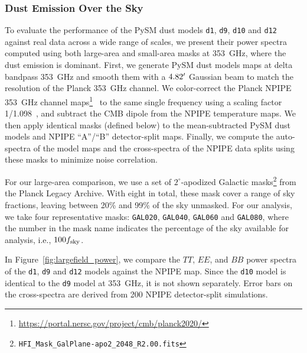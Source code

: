 \documentclass[twocolumn]{aastex631}
\begin{document}
\subsubsection{Dust Emission Over the Sky} 
\label{sec:dust_validation}
To evaluate the performance of the PySM dust models \texttt{d1}, \texttt{d9}, \texttt{d10} and \texttt{d12} against real data across a wide range of scales, we present their power spectra computed using both large-area and small-area masks at 353~GHz, where the dust emission is dominant. First, we generate PySM dust models maps at delta bandpass 353~GHz and smooth them with a $4.82\mbox{$^\prime$}$ Gaussian beam to match the resolution of the Planck 353~GHz channel. We color-correct the Planck NPIPE 353~GHz channel maps\footnote{\url{https://portal.nersc.gov/project/cmb/planck2020/}}~\citep{PlanckCollaboration:2020} to the same single frequency using a scaling factor 1/1.098~\citep{planck2016-l11A}, and subtract the CMB dipole from the NPIPE temperature maps. We then apply identical masks (defined below) to the mean-subtracted PySM dust models and NPIPE ``A''/``B'' detector-split maps. Finally, we compute the auto-spectra of the model maps and the cross-spectra of the NPIPE data splits using these masks to minimize noise correlation. 

For our large-area comparison, we use a set of $2^\circ$-apodized Galactic masks\footnote{\texttt{HFI\_Mask\_GalPlane-apo2\_2048\_R2.00.fits}} from the Planck Legacy Archive. With eight in total, these mask cover a range of sky fractions, leaving between 20\% and 99\% of the sky unmasked. For our analysis, we take four representative masks: \texttt{GAL020}, \texttt{GAL040}, \texttt{GAL060} and \texttt{GAL080}, where the number in the mask name indicates the percentage of the sky available for analysis, i.e., $100 f_{\rm sky}$.

In Figure~\ref{fig:largefield_power}, we compare the $TT$, $EE$, and $BB$ power spectra of the \texttt{d1}, \texttt{d9} and \texttt{d12} models against the NPIPE map. Since the \texttt{d10} model is identical to the \texttt{d9} model at 353~GHz, it is not shown separately. Error bars on the cross-spectra are derived from 200 NPIPE detector-split simulations.
\end{document}
